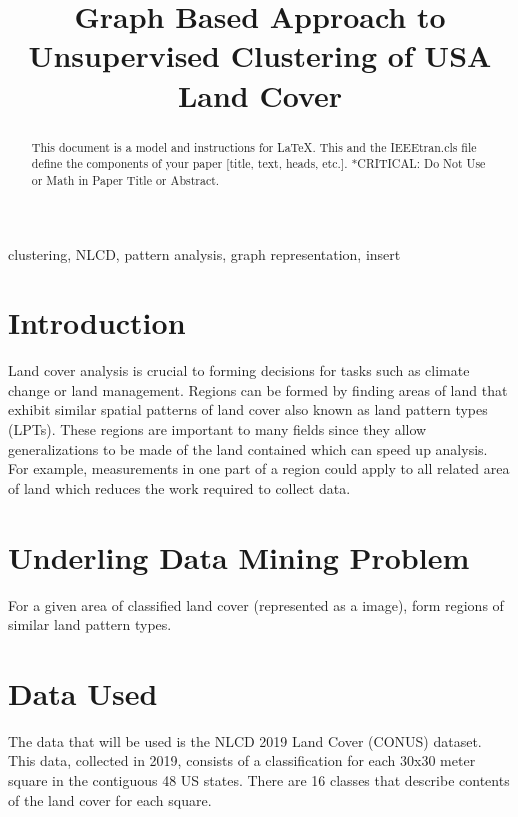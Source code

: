 \documentclass[journal,compsoc]{IEEEtran}
\begin{document}
	
\title{Graph Based Approach to Unsupervised Clustering of USA Land Cover}

\author{
}

\maketitle

\begin{abstract}
	This document is a model and instructions for \LaTeX.
	This and the IEEEtran.cls file define the components of your paper [title, text, heads, etc.]. *CRITICAL: Do Not Use %
	or Math in Paper Title or Abstract.
\end{abstract}

\begin{IEEEkeywords}
	clustering, NLCD, pattern analysis, graph representation, insert
\end{IEEEkeywords}

\section{Introduction}
Land cover analysis is crucial to forming decisions for tasks such as climate change or land management\cite{doi:10.1080/13658816.2015.1134796}. Regions can be formed by finding areas of land that exhibit similar spatial patterns of land cover also known as land pattern types (LPTs). These regions are important to many fields since they allow generalizations to be made of the land contained which can speed up analysis\cite{doi:10.1080/13658816.2015.1134796}. For example, measurements in one part of a region could apply to all related area of land which reduces the work required to collect data.

\section{Underling Data Mining Problem}
For a given area of classified land cover (represented as a image), form regions of similar land pattern types.

\section{Data Used}
The data that will be used is the NLCD 2019 Land Cover (CONUS) dataset. This data, collected in
2019, consists of a classification for each 30x30 meter square in the contiguous 48 US states.
There are 16 classes that describe contents of the land cover for each square. \cite{NLCD2019LandCover}
\end{document}
